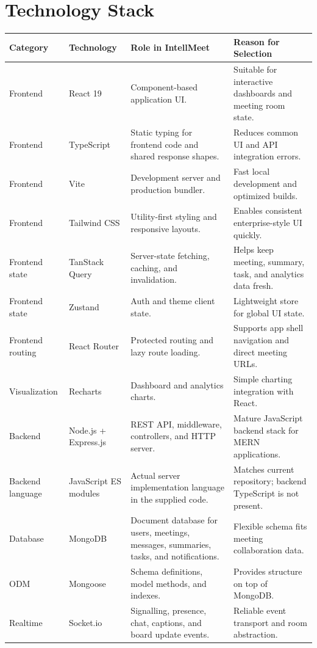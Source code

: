 \documentclass[11pt,a4paper]{article}
\begin{document}
\section{Technology Stack}
\begin{table}[H]
\centering
\small
{}
\begin{tabularx}{\linewidth}{L{2.5cm} L{3.0cm} Y Y}
\toprule
\textbf{Category} & \textbf{Technology} & \textbf{Role in IntellMeet} & \textbf{Reason for Selection}\\
\midrule
Frontend & React 19 & Component-based application UI. & Suitable for interactive dashboards and meeting room state.\\
Frontend & TypeScript & Static typing for frontend code and shared response shapes. & Reduces common UI and API integration errors.\\
Frontend & Vite & Development server and production bundler. & Fast local development and optimized builds.\\
Frontend & Tailwind CSS & Utility-first styling and responsive layouts. & Enables consistent enterprise-style UI quickly.\\
Frontend state & TanStack Query & Server-state fetching, caching, and invalidation. & Helps keep meeting, summary, task, and analytics data fresh.\\
Frontend state & Zustand & Auth and theme client state. & Lightweight store for global UI state.\\
Frontend routing & React Router & Protected routing and lazy route loading. & Supports app shell navigation and direct meeting URLs.\\
Visualization & Recharts & Dashboard and analytics charts. & Simple charting integration with React.\\
Backend & Node.js + Express.js & REST API, middleware, controllers, and HTTP server. & Mature JavaScript backend stack for MERN applications.\\
Backend language & JavaScript ES modules & Actual server implementation language in the supplied code. & Matches current repository; backend TypeScript is not present.\\
Database & MongoDB & Document database for users, meetings, messages, summaries, tasks, and notifications. & Flexible schema fits meeting collaboration data.\\
ODM & Mongoose & Schema definitions, model methods, and indexes. & Provides structure on top of MongoDB.\\
Realtime & Socket.io & Signalling, presence, chat, captions, and board update events. & Reliable event transport and room abstraction.\\

\end{tabularx}
\end{table}
\end{document}
